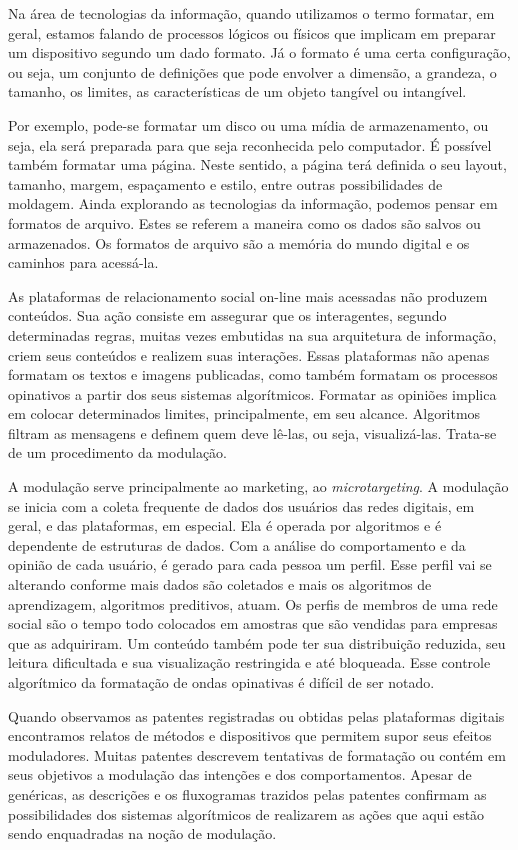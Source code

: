 Na área de tecnologias da informação, quando utilizamos o termo
formatar, em geral, estamos falando de processos lógicos ou físicos que
implicam em preparar um dispositivo segundo um dado formato. Já o
formato é uma certa configuração, ou seja, um conjunto de definições que
pode envolver a dimensão, a grandeza, o tamanho, os limites, as
características de um objeto tangível ou intangível.

Por exemplo, pode-se formatar um disco ou uma mídia de armazenamento, ou
seja, ela será preparada para que seja reconhecida pelo computador. É
possível também formatar uma página. Neste sentido, a página terá
definida o seu layout, tamanho, margem, espaçamento e estilo, entre
outras possibilidades de moldagem. Ainda explorando as tecnologias da
informação, podemos pensar em formatos de arquivo. Estes se referem a
maneira como os dados são salvos ou armazenados. Os formatos de arquivo
são a memória do mundo digital e os caminhos para acessá-la.

As plataformas de relacionamento social on-line mais acessadas não
produzem conteúdos. Sua ação consiste em assegurar que os interagentes,
segundo determinadas regras, muitas vezes embutidas na sua arquitetura
de informação, criem seus conteúdos e realizem suas interações. Essas
plataformas não apenas formatam os textos e imagens publicadas, como
também formatam os processos opinativos a partir dos seus sistemas
algorítmicos. Formatar as opiniões implica em colocar determinados
limites, principalmente, em seu alcance. Algoritmos filtram as mensagens
e definem quem deve lê-las, ou seja, visualizá-las. Trata-se de um
procedimento da modulação.

A modulação serve principalmente ao marketing, ao \emph{microtargeting}.
A modulação se inicia com a coleta frequente de dados dos usuários das
redes digitais, em geral, e das plataformas, em especial. Ela é operada
por algoritmos e é dependente de estruturas de dados. Com a análise do
comportamento e da opinião de cada usuário, é gerado para cada pessoa um
perfil. Esse perfil vai se alterando conforme mais dados são coletados e
mais os algoritmos de aprendizagem, algoritmos preditivos, atuam. Os
perfis de membros de uma rede social são o tempo todo colocados em
amostras que são vendidas para empresas que as adquiriram. Um conteúdo
também pode ter sua distribuição reduzida, seu leitura dificultada e sua
visualização restringida e até bloqueada. Esse controle algorítmico da
formatação de ondas opinativas é difícil de ser notado.

Quando observamos as patentes registradas ou obtidas pelas plataformas
digitais encontramos relatos de métodos e dispositivos que permitem
supor seus efeitos moduladores. Muitas patentes descrevem tentativas de
formatação ou contém em seus objetivos a modulação das intenções e dos
comportamentos. Apesar de genéricas, as descrições e os fluxogramas
trazidos pelas patentes confirmam as possibilidades dos sistemas
algorítmicos de realizarem as ações que aqui estão sendo enquadradas na
noção de modulação.

